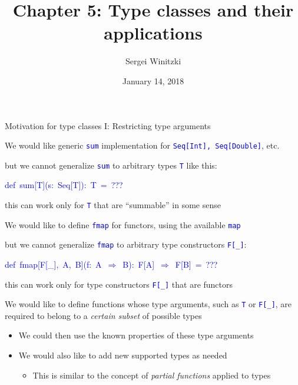 \documentclass[english]{beamer}
\title[Chapter 5: Type classes]{Chapter 5: Type classes
 and their applications}
\author{Sergei Winitzki}
\date{January 14, 2018}
\institute[ABTB]{Academy by the Bay}
\newenvironment{lyxcode}
   {\par\begin{list}{}{
     \setlength{\rightmargin}{\leftmargin}
     \setlength{\listparindent}{0pt}%
     \raggedright
     \setlength{\itemsep}{0pt}
     \setlength{\parsep}{0pt}
     \normalfont\ttfamily}%
    \def\{{\char`\{}
    \def\}{\char`\}}
    \def\textasciitilde{\char`\~}
    \item[]}
   {\end{list}}
\begin{document}
\frame{\titlepage}
\begin{frame}{Motivation for type classes I: Restricting type arguments}

We would like generic \texttt{\textcolor{blue}{\footnotesize{}sum}}
implementation for \texttt{\textcolor{blue}{\footnotesize{}Seq{[}Int{]},
Seq{[}Double{]}}}, etc.
\begin{itemize}
\item but we cannot generalize \texttt{\textcolor{blue}{\footnotesize{}sum}}
to arbitrary types \texttt{\textcolor{blue}{\footnotesize{}T}} like
this:
\begin{lyxcode}
\textcolor{blue}{\footnotesize{}def~sum{[}T{]}(s:~Seq{[}T{]}):~T~=~???}{\footnotesize \par}
\end{lyxcode}
\item this can work only for \texttt{\textcolor{blue}{\footnotesize{}T}}
that are ``summable'' in some sense
\end{itemize}
We would like to define \texttt{\textcolor{blue}{\footnotesize{}fmap}}
for functors, using the available \texttt{\textcolor{blue}{\footnotesize{}map}}
\ 
\begin{itemize}
\item but we cannot generalize \texttt{\textcolor{blue}{\footnotesize{}fmap}}
to arbitrary type constructors \texttt{\textcolor{blue}{\footnotesize{}F{[}\_{]}}}:
\begin{lyxcode}
\textcolor{blue}{\footnotesize{}def~fmap{[}F{[}\_{]},~A,~B{]}(f:~A~$\Rightarrow$~B):~F{[}A{]}~$\Rightarrow$~F{[}B{]}~=~???}{\footnotesize \par}
\end{lyxcode}
\item this can work only for type constructors \texttt{\textcolor{blue}{\footnotesize{}F{[}\_{]}}}
that are functors
\end{itemize}
We would like to define functions whose type arguments, such as \texttt{\textcolor{blue}{\footnotesize{}T}}
or \texttt{\textcolor{blue}{\footnotesize{}F{[}\_{]}}}, are required
to belong to a \emph{certain subset} of possible types
\begin{itemize}
\item We could then use the known properties of these type arguments
\item We would also like to add new supported types as needed
\begin{itemize}
\item This is similar to the concept of \emph{partial functions} \textendash{}
applied to types
\end{itemize}
\end{itemize}
\end{frame}
\end{document}
